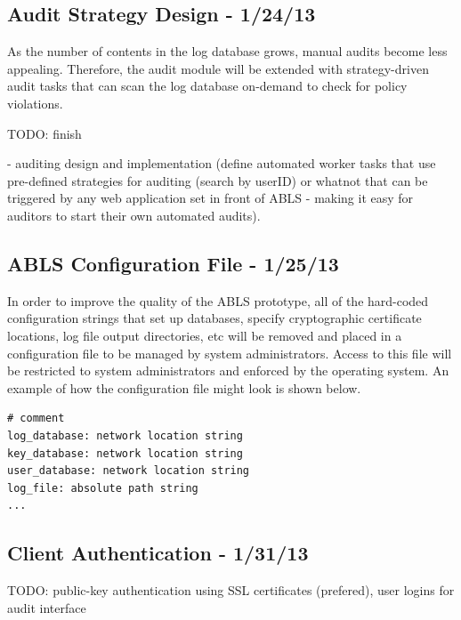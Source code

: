 \documentclass{sig-alternate}
\begin{document}
\subsection{Audit Strategy Design - 1/24/13}
As the number of contents in the log database grows, manual audits become less appealing. Therefore, the audit module
will be extended with strategy-driven audit tasks that can scan the log database on-demand to check for policy violations.

TODO: finish

- auditing design and implementation (define automated worker tasks that use pre-defined strategies for
auditing (search by userID) or whatnot that can be triggered by any web application set in front of ABLS - 
making it easy for auditors to start their own automated audits). 

\subsection{ABLS Configuration File - 1/25/13} 
In order to improve the quality of the ABLS prototype, all of the hard-coded configuration strings that set up databases,
specify cryptographic certificate locations, log file output directories, etc will be removed and placed in a configuration file
to be managed by system administrators. Access to this file will be restricted to system administrators and enforced by the 
operating system. An example of how the configuration file might look is shown below.

\begin{lstlisting}
# comment
log_database: network location string
key_database: network location string
user_database: network location string
log_file: absolute path string
...
\end{lstlisting}

\subsection{Client Authentication - 1/31/13}
\label{sec:auth}

TODO: public-key authentication using SSL certificates (prefered), user logins for audit interface
\end{document}
